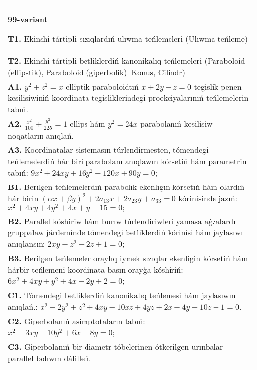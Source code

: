 \documentclass{article}
\begin{document}
\begin{tabular}{m{17cm}}
\textbf{99-variant}
\newline

\textbf{T1.} Ekinshi tártipli sızıqlardıń ulıwma teńlemeleri (Ulıwma teńleme) \\
\textbf{T2.} Ekinshi tártipli betliklerdiń kanonikalıq teńlemeleri (Paraboloid (ellipstik), Paraboloid (giperbolik), Konus, Cilindr) \\
\textbf{A1.} $y^2+z^2=x$ elliptik paraboloidtıń $x+2 y-z=0$ tegislik penen kesilisiwiniń koordinata tegisliklerindegi proekciyalarınıń teńlemelerin tabıń. \\
\textbf{A2.} $\frac{x^2}{100}+\frac{y^2}{225}=1$ ellips hám $y^2=24 x$ parabolanıń kesilisiw noqatların anıqlań. \\
\textbf{A3.} Koordinatalar sistemasın túrlendirmesten, tómendegi teńlemelerdiń hár biri parabolanı anıqlawın kórsetiń hám parametrin tabıń: $9 x^2+24 x y+16 y^2-120 x+90 y=0$; \\
\textbf{B1.} Berilgen teńlemelerdiń parabolik ekenligin kórsetiń hám olardıń hár birin $(\alpha x+\beta y)^2+2 a_{13} x+2 a_{23} y+a_{33}=0$ kórinisinde jazıń: $x^2+4 x y+4 y^2+4 x+y-15=0 ;$ \\
\textbf{B2.} Parallel kóshiriw hám burıw túrlendiriwleri yamasa aǵzalardı gruppalaw járdeminde tómendegi betliklerdiń kórinisi hám jaylasıwı anıqlansın: $2 x y+z^2-2 z+1=0$; \\
\textbf{B3.} Berilgen teńlemeler oraylıq iymek sızıqlar ekenligin kórsetiń hám hárbir teńlemeni koordinata basın orayģa kóshiriń: $6 x^2+4 x y+y^2+4 x-2 y+2=0$; \\
\textbf{C1.} Tómendegi betliklerdiń kanonikalıq teńlemesi hám jaylasıwın anıqlań.: $x^2-2 y^2+z^2+4 x y-10 x z+4 y z+2 x+4 y-10 z-1=0$. \\
\textbf{C2.} Giperbolanıń asimptotaların tabıń: $x^2-3 x y-10 y^2+6 x-8 y=0$; \\
\textbf{C3.} Giperbolanıń bir diametr tóbelerinen ótkerilgen urınbalar parallel bolıwın dálilleń. \\

\end{tabular}
\vspace{1cm}
\end{document}

